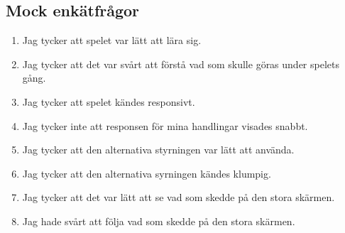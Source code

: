 \documentclass[10pt]{article}
\begin{document}
	\subsection*{Mock enkätfrågor}
	\begin{enumerate}
		\item Jag tycker att spelet var lätt att lära sig. 
		\item Jag tycker att det var svårt att förstå vad som skulle göras under spelets gång.
		\item Jag tycker att spelet kändes responsivt.
		\item Jag tycker inte att responsen för mina handlingar visades snabbt.
		\item Jag tycker att den alternativa styrningen var lätt att använda.
		\item Jag tycker att den alternativa syrningen kändes klumpig.
		\item Jag tycker att det var lätt att se vad som skedde på den stora skärmen.
		\item Jag hade svårt att följa vad som skedde på den stora skärmen.
		
	\end{enumerate}




	
\pagebreak

\printbibliography
{}
\end{document}
